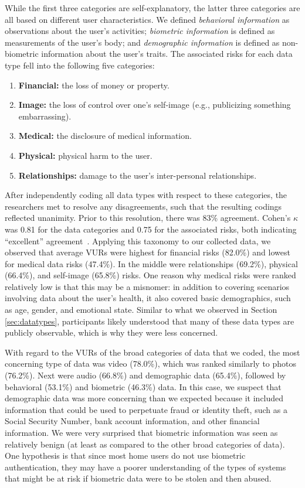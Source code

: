 While the first three categories are self-explanatory, the latter three categories are all based on different user characteristics. We defined {\it behavioral information} as observations about the user's activities; {\it biometric information} is defined as measurements of the user's body; and {\it demographic information} is defined as non-biometric information about the user's traits. The associated risks for each data type fell into the following five categories:
\begin{enumerate}[topsep=0pt,itemsep=-1ex,partopsep=1ex,parsep=1ex]
\item {\bf Financial:} the loss of money or property.
\item {\bf Image:} the loss of control over one's self-image (e.g., publicizing something embarrassing).
\item {\bf Medical:} the disclosure of medical information.
\item {\bf Physical:} physical harm to the user.
\item {\bf Relationships:} damage to the user's inter-personal relationships.
\end{enumerate}

After independently coding all data types with respect to these categories, the researchers met to resolve any disagreements, such that the resulting codings reflected unanimity. Prior to this resolution, there was  83\% agreement. Cohen's $\kappa$ was 0.81 for the data categories and 0.75 for the associated risks, both indicating ``excellent'' agreement~\cite{Fleiss2003}. Applying this taxonomy to our collected data, we observed that average VURs were highest for financial risks (82.0\%) and lowest for medical data risks (47.4\%). In the middle were relationships (69.2\%), physical (66.4\%), and self-image (65.8\%) risks. One reason why medical risks were ranked relatively low is that this may be a misnomer: in addition to covering scenarios involving data about the user's health, it also covered basic demographics, such as age, gender, and emotional state. Similar to what we observed in Section \ref{sec:datatypes}, participants likely understood that many of these data types are publicly observable, which is why they were less concerned.

With regard to the VURs of the broad categories of data that we coded, the most concerning type of data was video (78.0\%), which was ranked similarly to photos (76.2\%). Next were audio (66.8\%) and demographic data (65.4\%), followed by behavioral (53.1\%) and biometric (46.3\%) data. In this case, we suspect that demographic data was more concerning than we expected because it included information that could be used to perpetuate fraud or identity theft, such as a Social Security Number, bank account information, and other financial information. We were very surprised that biometric information was seen as relatively benign (at least as compared to the other broad categories of data). One hypothesis is that since most home users do not use biometric authentication, they may have a poorer understanding of the types of systems that might be at risk if biometric data were to be stolen and then abused.


